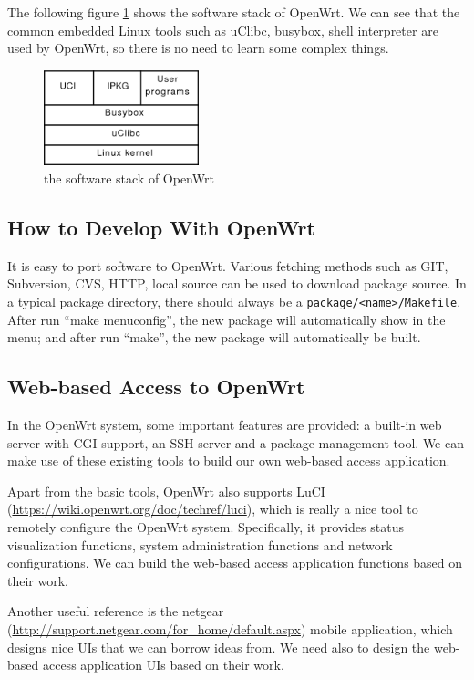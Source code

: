 \documentclass{sig-alternate-05-2015}
\begin{document}
The following figure \ref{OpenWrt:stack} shows the software stack of OpenWrt. We can see that the common embedded Linux tools such as uClibc, busybox, shell interpreter are used by OpenWrt, so there is no need to learn some complex things.

\begin{figure}
	\centering
	\includegraphics[width=0.4\textwidth]{stack.png}
	\caption{the software stack of OpenWrt}
	\label{OpenWrt:stack}
\end{figure}

\subsection{How to Develop With OpenWrt}

It is easy to port software to OpenWrt. Various fetching methods such as GIT, Subversion, CVS, HTTP, local source can be used to download package source. In a typical package directory, there should always be a \verb|package/<name>/Makefile|. After run ``make menuconfig'', the new package will automatically show in the menu; and after run ``make'', the new package will automatically be built.

\subsection{Web-based Access to OpenWrt}
In the OpenWrt system, some important features are provided: a built-in web server with CGI support, an SSH server and a package management tool. We can make use of these existing tools to build our own web-based access application.

Apart from the basic tools, OpenWrt also supports LuCI (\url {https://wiki.openwrt.org/doc/techref/luci}), which is really a nice tool to remotely configure the OpenWrt system. Specifically, it provides status visualization functions, system administration functions and network configurations. We can build the web-based access application functions based on their work.

Another useful reference is the netgear (\url{http://support.netgear.com/for_home/default.aspx}) mobile application, which designs nice UIs that we can borrow ideas from. We need also to design the web-based access application UIs based on their work.
\end{document}
